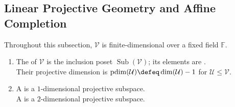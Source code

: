 \subsection{Linear Projective Geometry and Affine Completion}

Throughout this subsection, $\mathcal{V}$ is finite-dimensional over a fixed field $\mathbb{F}$.

\begin{definition} \label{def:projective-geometry-vector-space} 
\begin{enumerate}[label=(\roman*)]
\setlength{\itemsep}{0pt}
\item The  of $\mathcal{V}$ is the inclusion poset $\operatorname{Sub}(\mathcal{V})$; its elements are .\\
Their projective dimension is $\operatorname{pdim}(\mathcal{U})\defeq\dim(\mathcal{U})-1$ for $\mathcal{U}\leq\mathcal{V}$.
\item A  is a $1$-dimensional projective subspace.\\
A  is a $2$-dimensional projective subspace.
\end{enumerate}
\end{definition}

